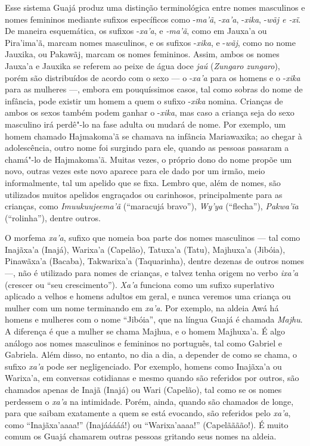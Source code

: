 Esse sistema Guajá produz uma distinção terminológica entre nomes
masculinos e nomes femininos mediante sufixos específicos como
-\emph{ma'ã}, -\emph{xa'a}, -\emph{xika}, -\emph{wãj e -xĩ}. De maneira
esquemática, os sufixos -\emph{xa'a}, e \emph{-ma'ã}, como em Jauxa'a ou
Pira'ima'ã, marcam nomes masculinos, e os sufixos -\emph{xika}, e
-\emph{wãj}, como no nome Jauxika, ou Pakawãj, marcam os nomes
femininos. Assim, ambos os nomes Jauxa'a e Jauxika se referem ao peixe
de água doce \emph{jaú} (\emph{Zungaro zungaro}), porém são distribuídos
de acordo com o sexo --- o -\emph{xa'a} para os homens e o
-\emph{xika} para as mulheres ---, embora em pouquíssimos casos,
tal como sobras do nome de infância, pode existir um homem a quem o
sufixo -\emph{xika} nomina. Crianças de ambos os sexos também podem
ganhar o -\emph{xika}, mas caso a criança seja do sexo masculino irá
perdê"-lo na fase adulta ou mudará de nome. Por exemplo, um homem chamado
Hajmakoma'ã se chamava na infância Mariawaxika; ao chegar à
adolescência, outro nome foi surgindo para ele, quando as pessoas
passaram a chamá"-lo de Hajmakoma'ã. Muitas vezes, o próprio dono do nome
propõe um novo, outras vezes este novo aparece para ele dado por um
irmão, meio informalmente, tal um apelido que se fixa. Lembro que, além
de nomes, são utilizados muitos apelidos engraçados ou carinhosos,
principalmente para as crianças, como \emph{Imuukuujeema'ã} (``maracujá
bravo''), \emph{Wy'ya} (``flecha''), \emph{Pakwa'ĩa} (``rolinha''), dentre
outros.

O morfema \emph{xa'a}, sufixo que nomeia boa parte dos nomes masculinos
--- tal como Inajãxa'a (Inajá), Warixa'a (Capelão), Tatuxa'a (Tatu),
Majhuxa'a (Jibóia), Pinawãxa'a (Bacaba), Takwarixa'a (Taquarinha),
dentre dezenas de outros nomes ---, não é utilizado para nomes de
crianças, e talvez tenha origem no verbo \emph{ixa'a} (crescer ou ``seu
crescimento''). \emph{Xa'a} funciona como um sufixo superlativo aplicado
a velhos e homens adultos em geral, e nunca veremos uma criança ou
mulher com um nome terminando em \emph{xa'a}. Por exemplo, na aldeia
Awá há homens e mulheres com o nome ``Jibóia'', que na língua
Guajá é chamada \emph{Majhu}. A diferença é que a mulher se chama
Majhua, e o homem Majhuxa'a. É algo análogo aos nomes masculinos e
femininos no português, tal como Gabriel e Gabriela. Além disso, no
entanto, no dia a dia, a depender de como se chama, o sufixo \emph{xa'a}
pode ser negligenciado. Por exemplo, homens como Inajãxa'a ou Warixa'a,
em conversas cotidianas e mesmo quando são referidos por outros, são
chamados apenas de Inajã (Inajá) ou Wari (Capelão), tal como se os nomes
perdessem o \emph{xa'a} na intimidade. Porém, ainda, quando são chamados
de longe, para que saibam exatamente a quem se está evocando, são
referidos pelo \emph{xa'a}, como ``Inajãxa'aaaa!'' (Inajááááá!) ou
``Warixa'aaaa!'' (Capelãããão!). É muito comum os Guajá chamarem outras
pessoas gritando seus nomes na aldeia.

